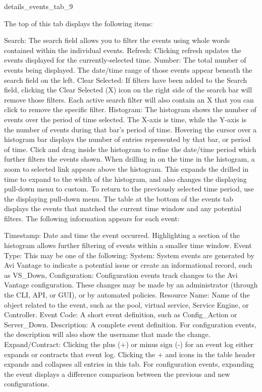 \documentclass[letterpaper,10pt,english]{sphinxmanual}
\begin{document}
details\_events\_tab\_9

The top of this tab displays the following items:

Search: The search field allows you to filter the events using whole words contained within the individual events.
Refresh: Clicking refresh updates the events displayed for the currently-selected time.
Number: The total number of events being displayed. The date/time range of those events appear beneath the search field on the left.
Clear Selected: If filters have been added to the Search field, clicking the Clear Selected (X) icon on the right side of the search bar will remove those filters. Each active search filter will also contain an X that you can click to remove the specific filter.
Histogram: The histogram shows the number of events over the period of time selected. The X-axis is time, while the Y-axis is the number of events during that bar’s period of time.
Hovering the cursor over a histogram bar displays the number of entries represented by that bar, or period of time.
Click and drag inside the histogram to refine the date/time period which further filters the events shown. When drilling in on the time in the histogram, a zoom to selected link appears above the histogram. This expands the drilled in time to expand to the width of the histogram, and also changes the displaying pull-down menu to custom. To return to the previously selected time period, use the displaying pull-down menu.
The table at the bottom of the events tab displays the events that matched the current time window and any potential filters. The following information appears for each event:

Timestamp: Date and time the event occurred. Highlighting a section of the histogram allows further filtering of events within a smaller time window.
Event Type: This may be one of the following:
System: System events are generated by Avi Vantage to indicate a potential issue or create an informational record, such as VS\_Down,
Configuration: Configuration events track changes to the Avi Vantage configuration. These changes may be made by an administrator (through the CLI, API, or GUI), or by automated policies.
Resource Name: Name of the object related to the event, such as the pool, virtual service, Service Engine, or Controller.
Event Code: A short event definition, such as Config\_Action or Server\_Down.
Description: A complete event definition. For configuration events, the description will also show the username that made the change.
Expand/Contract: Clicking the plus (+) or minus sign (-) for an event log either expands or contracts that event log. Clicking the + and \textendash{} icons in the table header expands and collapses all entries in this tab.
For configuration events, expanding the event displays a difference comparison between the previous and new configurations.
\end{document}
